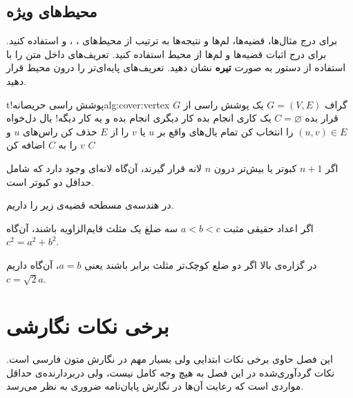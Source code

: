 \subsection{محیط‌های ویژه}
برای درج مثال‌ها، قضیه‌ها، لم‌ها و نتیجه‌ها به ترتیب از محیط‌های ، ،  و  استفاده کنید. برای درج اثبات قضیه‌ها و لم‌ها  از محیط  استفاده کنید. تعریف‌های داخل متن را با استفاده از دستور به صورت \textbf{تیره‌} نشان دهید. تعریف‌های پایه‌ای‌تر را درون محیط  قرار دهید.

\begin{alg}{t!}{پوشش راسی حریصانه}{alg:cover:vertex}
\AlgInput
گراف $G=(V, E)$
\AlgOutput
یک پوشش راسی از $G$
\vspace*{0.3em}
\State
قرار بده $C = \varnothing$
    \State 
یک کاری انجام بده
	\State
کار دیگری انجام بده
\Else
	\State
و یه کار دیگه!
\EndIf
\State
یال دل‌‌خواه $(u, v) \in E$ را انتخاب کن
\State
تمام یال‌های واقع بر $u$ یا $v$ را از $E$ حذف کن
\State
راس‌های $u$ و $v$ را به $C$ اضافه کن
\EndWhile
\State \Return $C$
\EndProcedure
\end{alg}

\begin{defn}
اگر $n+1$ کبوتر یا بیش‌تر درون  $n$ لانه قرار گیرند، آن‌گاه لانه‌ای 
وجود دارد که شامل حداقل دو کبوتر است.
\end{defn}
در هندسه‌ی مسطحه قضیه‌ی زیر را داریم.
\begin{thm}[فیثاغورس]
اگر اعداد حقیقی مثبت $a < b < c$ سه ضلغ یک مثلث قایم‌الزاویه باشند، آن‌گاه $c^2 = a^2 + b^2$.
\end{thm}

\begin{rem}
در گزاره‌ی بالا اگر دو ضلع کوچک‌تر مثلث برابر باشند یعنی $a = b$، آن‌گاه داریم $c = \sqrt{2}a$.
\end{rem}


\section{برخی نکات نگارشی}
این فصل حاوی برخی نکات ابتدایی ولی بسیار مهم در نگارش متون فارسی است. نکات گردآوری‌شده در این فصل به‌ هیچ‌ وجه کامل نیست، ولی دربردارنده‌ی حداقل مواردی است که رعایت آن‌ها در نگارش پایان‌نامه ضروری به نظر می‌رسد.


